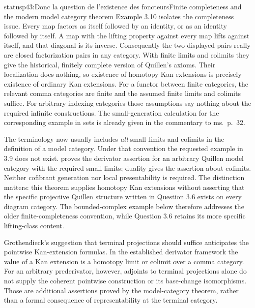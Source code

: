 \begin{dcomment}{status}{p43:Donc la question de l'existence des foncteurs}{Finite completeness and the modern model category theorem}
Example 3.10 isolates the completeness issue. Every map factors as itself followed by an identity, or as an identity followed by itself. A map with the lifting property against every map lifts against itself, and that diagonal is its inverse. Consequently the two displayed pairs really are closed factorization pairs in any category. With finite limits and colimits they give the historical, finitely complete version of Quillen's axioms. Their localization does nothing, so existence of homotopy Kan extensions is precisely existence of ordinary Kan extensions. For a functor between finite categories, the relevant comma categories are finite and the assumed finite limits and colimits suffice. For arbitrary indexing categories those assumptions say nothing about the required infinite constructions. The small-generation calculation for the corresponding example in sets is already given in the commentary to ms.~p.~32.

The terminology now usually includes \emph{all} small limits and colimits in the definition of a model category. Under that convention the requested example in 3.9 does not exist. \citet[Theorem~6.11]{Cisinski2003} proves the derivator assertion for an arbitrary Quillen model category with the required small limits; duality gives the assertion about colimits. Neither cofibrant generation nor local presentability is required. The distinction matters: this theorem supplies homotopy Kan extensions without asserting that the specific projective Quillen structure written in Question 3.6 exists on every diagram category. The bounded-complex example below therefore addresses the older finite-completeness convention, while Question 3.6 retains its more specific lifting-class content.

Grothendieck's suggestion that terminal projections should suffice anticipates the pointwise Kan-extension formulas. In the established derivator framework the value of a Kan extension is a homotopy limit or colimit over a comma category. For an arbitrary prederivator, however, adjoints to terminal projections alone do not supply the coherent pointwise construction or its base-change isomorphisms. Those are additional assertions proved by the model-category theorem, rather than a formal consequence of representability at the terminal category.
\end{dcomment}

